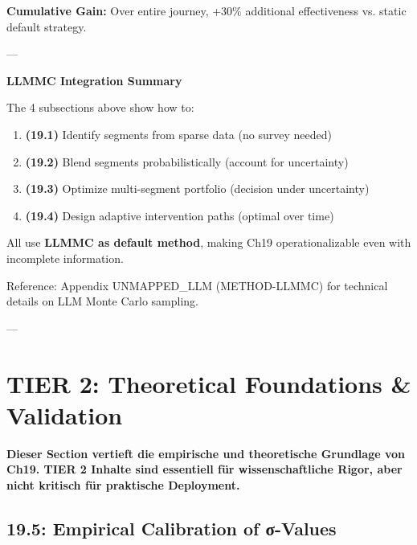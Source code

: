 \textbf{Cumulative Gain:} Over entire journey, +30\% additional effectiveness vs. static default strategy.

---

\textbf{LLMMC Integration Summary}

The 4 subsections above show how to:
\begin{enumerate}[nosep]
\item \textbf{(19.1)} Identify segments from sparse data (no survey needed)
\item \textbf{(19.2)} Blend segments probabilistically (account for uncertainty)
\item \textbf{(19.3)} Optimize multi-segment portfolio (decision under uncertainty)
\item \textbf{(19.4)} Design adaptive intervention paths (optimal over time)
\end{enumerate}

All use \textbf{LLMMC as default method}, making Ch19 operationalizable even with incomplete information.

Reference: Appendix UNMAPPED_LLM (METHOD-LLMMC) for technical details on LLM Monte Carlo sampling.

---

\section{TIER 2: Theoretical Foundations \& Validation}
\label{sec:19-tier2}

\textbf{Dieser Section vertieft die empirische und theoretische Grundlage von Ch19. TIER 2 Inhalte sind essentiell für wissenschaftliche Rigor, aber nicht kritisch für praktische Deployment.}

\subsection{19.5: Empirical Calibration of σ-Values}
\label{subsec:19-empirical-calibration}

